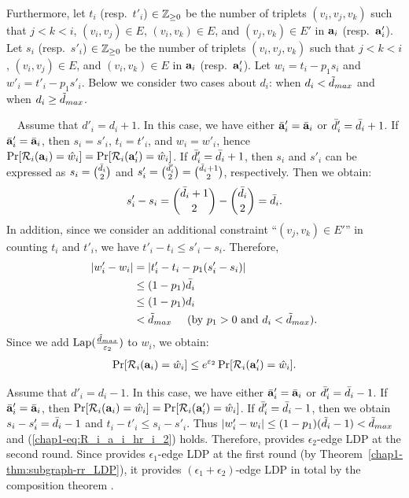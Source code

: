 {Furthermore, 
let $t_i$ (resp.~$t'_i$) $\in \mathbb{Z}_{\ge0}$ be the number of triplets $(v_i, v_j, v_k)$ such that $j < k < i$, $(v_i,v_j) \in E$, $(v_i,v_k) \in E$, and $(v_j,v_k) \in E'$ in $\mathbf{a}_i$ (resp.~$\mathbf{a}'_i$). 
Let $s_i$ (resp.~$s'_i$) $\in \mathbb{Z}_{\ge0}$ be the number of triplets $(v_i, v_j, v_k)$ such that $j < k < i$, $(v_i,v_j) \in E$, and $(v_i,v_k) \in E$ in $\mathbf{a}_i$ (resp.~$\mathbf{a}'_i$). 
Let $w_i = t_i - p_1 s_i$ and $w'_i = t'_i - p_1 s'_i$. 
Below we consider two cases about $d_i$: when $d_i < \tilde{d}_{max}$ and when $d_i \geq \tilde{d}_{max}$. 

\smallskip
{}~~Assume that $d'_i = d_i + 1$. 
In this case, we have either $\bar{\mathbf{a}}'_i = \bar{\mathbf{a}}_i$ or $\bar{d}'_i = \bar{d}_i+1$. 
If $\bar{\mathbf{a}}'_i = \bar{\mathbf{a}}_i$, then $s_i = s'_i$, $t_i = t'_i$, and $w_i = w'_i$, hence $\Pr[\mathcal{R}_i(\mathbf{a}_i) = \hat{w}_i] = \Pr[\mathcal{R}_i(\mathbf{a}'_i) = \hat{w}_i]$. 
If $\bar{d}'_i = \bar{d}_i+1$, then $s_i$ and $s'_i$ can be expressed as $s_i = \binom{\bar{d}_i}{2}$ and $s'_i = \binom{\bar{d}'_i}{2} = \binom{\bar{d}_i+1}{2}$, respectively. 
Then we obtain:
\begin{align*}
s'_i - s_i = \binom{\bar{d}_i+1}{2} - \binom{\bar{d}_i}{2} = \bar{d}_i.
\end{align*}
In addition, since we consider an additional constraint ``$(v_j,v_k) \in E'$'' in counting $t_i$ and $t'_i$, 
we have $t'_i - t_i \leq s'_i - s_i$. 
Therefore, 
\begin{align*}
|w'_i - w_i| 
&= |t'_i - t_i - p_1 (s'_i - s_i)| \\
&\leq (1 - p_1) \bar{d}_i \\
&\leq (1 - p_1) d_i \\
&< \tilde{d}_{max} \hspace{5mm} \text{(by $p_1 > 0$ and $d_i < \tilde{d}_{max}$)}.
\end{align*}
Since we add $\textrm{Lap}(\frac{\tilde{d}_{max}}{\varepsilon_2})$ to $w_i$, we obtain:
\begin{align}
\Pr[\mathcal{R}_i(\mathbf{a}_i) = \hat{w}_i] \leq e^{\varepsilon_2} \Pr[\mathcal{R}_i(\mathbf{a}'_i) = \hat{w}_i]. 
\label{chap1-eq:R_i_a_i_hr_i_2}
\end{align}

Assume that $d'_i = d_i - 1$. 
In this case, we have either $\bar{\mathbf{a}}'_i = \bar{\mathbf{a}}_i$ or $\bar{d}'_i = \bar{d}_i-1$. 
If $\bar{\mathbf{a}}'_i = \bar{\mathbf{a}}_i$, then $\Pr[\mathcal{R}_i(\mathbf{a}_i) = \hat{w}_i] = \Pr[\mathcal{R}_i(\mathbf{a}'_i) = \hat{w}_i]$. 
If $\bar{d}'_i = \bar{d}_i-1$, then we obtain $s_i - s'_i = \bar{d}_i - 1$ and $t_i - t'_i \leq s_i - s'_i$. 
Thus $|w'_i - w_i| \leq (1-p_1) (\tilde{d}_i - 1) < \tilde{d}_{max}$ and (\ref{chap1-eq:R_i_a_i_hr_i_2}) holds. 
Therefore,  provides $\epsilon_2$-edge LDP at the second round. 
Since  provides $\epsilon_1$-edge LDP at the first round (by Theorem~\ref{chap1-thm:subgraph-rr_LDP}), it provides $(\epsilon_1 + \epsilon_2)$-edge LDP in total by the composition theorem \cite{DP}. 

}
